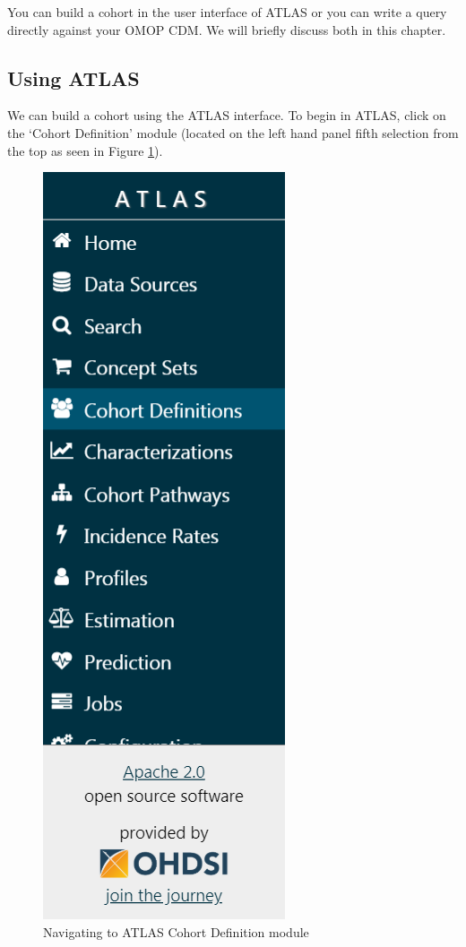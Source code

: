 \documentclass[11pt]{book}
\theoremstyle{definition}
\theoremstyle{definition}
\theoremstyle{definition}
\theoremstyle{remark}
\begin{document}
You can build a cohort in the user interface of ATLAS or you can write a query directly against your OMOP CDM. We will briefly discuss both in this chapter.

\hypertarget{using-atlas}{%
\subsection{Using ATLAS}\label{using-atlas}}

We can build a cohort using the ATLAS interface. To begin in ATLAS, click on the `Cohort Definition' module (located on the left hand panel fifth selection from the top as seen in Figure \ref{fig:ATLAScohort}).

\begin{figure}

{\centering \includegraphics[width=0.5\linewidth]{images/Cohorts/ATLAS-cohort} 

}

\caption{Navigating to ATLAS Cohort Definition module}\label{fig:ATLAScohort}
\end{figure}
\end{document}
